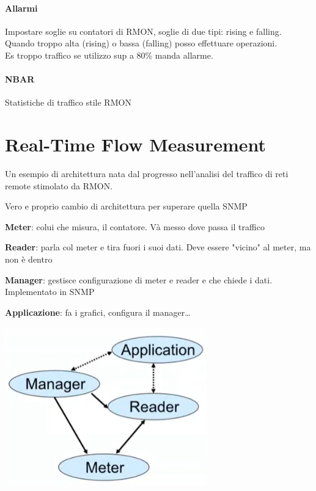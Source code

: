 \documentclass[10pt]{book}
\begin{document}
\paragraph{Allarmi} Impostare soglie su contatori di RMON, soglie di due tipi: rising e falling. Quando troppo alta (rising) o bassa (falling) posso effettuare operazioni.\\
Es troppo traffico se utilizzo sup a 80\% manda allarme.
\paragraph{NBAR} Statistiche di traffico stile RMON
\section{Real-Time Flow Measurement} Un esempio di architettura nata dal progresso nell'analisi del traffico di reti remote stimolato da RMON.
\begin{multicols}{2}
Vero e proprio cambio di architettura per superare quella SNMP
\begin{list}{}{}
	\item \textbf{Meter}: colui che misura, il contatore. Và messo dove passa il traffico
	\item \textbf{Reader}: parla col meter e tira fuori i suoi dati. Deve essere "vicino" al meter, ma non è dentro
	\item \textbf{Manager}: gestisce configurazione di meter e reader e che chiede i dati. Implementato in SNMP
	\item \textbf{Applicazione}: fa i grafici, configura il manager\ldots
\end{list}
\columnbreak
\begin{center}
	\includegraphics[scale=0.75]{rtfm.png}
\end{center}
\end{multicols}
\end{document}
